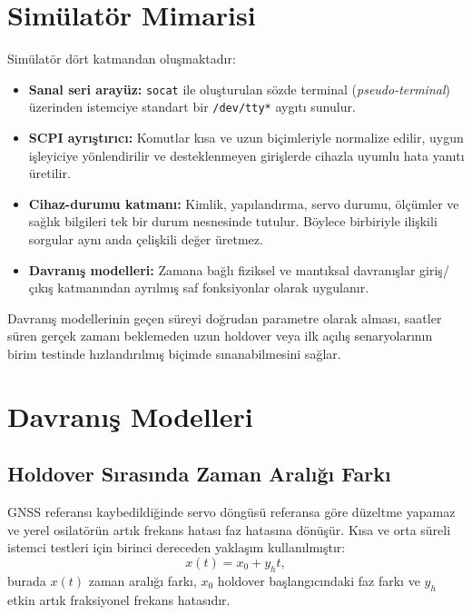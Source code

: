 \documentclass[9pt,twocolumn,a4paper]{extarticle}
\begin{document}
\section{Simülatör Mimarisi}
Simülatör dört katmandan oluşmaktadır:
\begin{itemize}
    \item \textbf{Sanal seri arayüz:} \texttt{socat} ile oluşturulan sözde terminal (\emph{pseudo-terminal}) üzerinden istemciye standart bir \texttt{/dev/tty*} aygıtı sunulur.
    \item \textbf{SCPI ayrıştırıcı:} Komutlar kısa ve uzun biçimleriyle normalize edilir, uygun işleyiciye yönlendirilir ve desteklenmeyen girişlerde cihazla uyumlu hata yanıtı üretilir.
    \item \textbf{Cihaz-durumu katmanı:} Kimlik, yapılandırma, servo durumu, ölçümler ve sağlık bilgileri tek bir durum nesnesinde tutulur. Böylece birbiriyle ilişkili sorgular aynı anda çelişkili değer üretmez.
    \item \textbf{Davranış modelleri:} Zamana bağlı fiziksel ve mantıksal davranışlar giriş/çıkış katmanından ayrılmış saf fonksiyonlar olarak uygulanır.
\end{itemize}

Davranış modellerinin geçen süreyi doğrudan parametre olarak alması, saatler süren gerçek zamanı beklemeden uzun holdover veya ilk açılış senaryolarının birim testinde hızlandırılmış biçimde sınanabilmesini sağlar.

\section{Davranış Modelleri}
\subsection{Holdover Sırasında Zaman Aralığı Farkı}
GNSS referansı kaybedildiğinde servo döngüsü referansa göre düzeltme yapamaz ve yerel osilatörün artık frekans hatası faz hatasına dönüşür. Kısa ve orta süreli istemci testleri için birinci dereceden yaklaşım kullanılmıştır:
\begin{equation}
    x(t)=x_0+y_h t,
    \label{eq:holdover}
\end{equation}
burada $x(t)$ zaman aralığı farkı, $x_0$ holdover başlangıcındaki faz farkı ve $y_h$ etkin artık fraksiyonel frekans hatasıdır.
\end{document}
